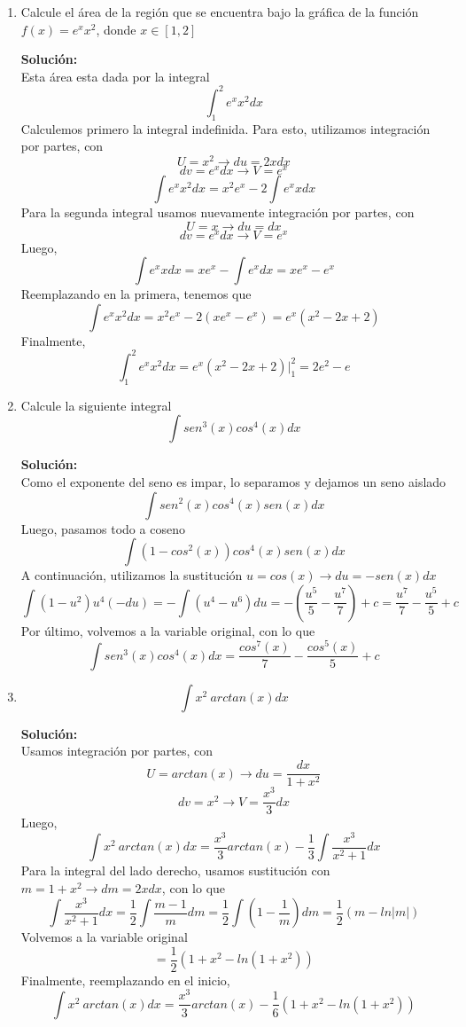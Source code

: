 \documentclass[12pt]{article}
\newenvironment{solucion}
{\begin{mdframed}[backgroundcolor=black!10]
		{\bf Solución:}\\
	}
	{
	\end{mdframed}
}
\newenvironment{preguntas}
{\begin{enumerate}\itemsep12pt
	}
	{
	\end{enumerate}
}
\newcommand{\ev}{\Big|}
\newcommand{\ra}{\rightarrow}
\begin{document}
\begin{preguntas}
\begin{solucion}
		$$\dfrac{x^3+6x^2+13x+10}{x+1} = x^2 +5x + 8 + \dfrac{2}{x+1}$$
		Luego,
		$$\displaystyle\int_0^1 \dfrac{x^3+6x^2+13x+10}{x+1}dx = \displaystyle\int_0^1 \left(x^2 + 5x + 8 +  \dfrac{2}{x+1}\right)dx$$
		$$= \left( \dfrac{x^3}{3} + \dfrac{5x^2}{2} + 8x + 2ln(x+1)\right) \ev_0^1 = \dfrac{1}{3} + \dfrac{5}{2} + 8 + 2ln(2) = \dfrac{65}{6} + 2 ln(2)$$
\end{solucion}
\item Calcule el área de la región que se encuentra bajo la gráfica de la función $f(x) = e^xx^2$, donde $x \in [1,2]$
\begin{solucion}
Esta área esta dada por la integral
		$$\displaystyle \int_1^2 e^x x^2dx$$
		Calculemos primero la integral indefinida. Para esto, utilizamos integración por partes, con
		$$U = x^2 \ra du = 2xdx$$
		$$dv = e^xdx \ra V = e^x$$
		$$\displaystyle \int e^x x^2dx = x^2e^x - 2 \displaystyle \int e^x xdx$$
		Para la segunda integral usamos nuevamente integración por partes, con
		$$U = x \ra du = dx$$
		$$dv = e^xdx \ra V = e^x$$
		Luego,
		$$\displaystyle \int e^x xdx = xe^x - \displaystyle \int e^x dx = xe^x - e^x$$
		Reemplazando en la primera, tenemos que
		$$\displaystyle \int e^x x^2dx = x^2e^x - 2 (xe^x - e^x) = e^x(x^2-2x+2)$$
		Finalmente,
		$$\displaystyle \int_1^2 e^x x^2dx = e^x(x^2-2x+2) \ev_1^2 = 2e^2 - e$$
\end{solucion}
\item Calcule la siguiente integral
	$$\displaystyle\int sen^3(x)cos^4(x)dx$$
\begin{solucion}
Como el exponente del seno es impar, lo separamos y dejamos un seno aislado
		$$\displaystyle\int sen^2(x)cos^4(x) sen(x)dx$$
		Luego, pasamos todo a coseno
		$$\displaystyle\int (1-cos^2(x))cos^4(x) sen(x)dx$$
		A continuación, utilizamos la sustitución $u = cos(x) \ra du = -sen(x)dx$
		$$\displaystyle\int (1-u^2)u^4(- du) = -\displaystyle\int (u^4-u^6)du = -(\dfrac{u^5}{5} - \dfrac{u^7}{7}) +c= \dfrac{u^7}{7}-\dfrac{u^5}{5} + c$$
		Por último, volvemos a la variable original, con lo que
		$$\displaystyle\int sen^3(x)cos^4(x)dx = \dfrac{cos^7(x)}{7}-\dfrac{cos^5(x)}{5} + c$$
\end{solucion}
\item $$\displaystyle\int x^2\ arctan(x)dx$$
\begin{solucion}
Usamos integración por partes, con
		$$U = arctan(x) \ra du = \dfrac{dx}{1+x^2}$$
		$$dv = x^2 \ra V = \dfrac{x^3}{3}dx$$
		Luego,
		$$\displaystyle\int x^2\ arctan(x)dx = \dfrac{x^3}{3}arctan(x) - \dfrac{1}{3} \displaystyle\int \dfrac{x^3}{x^2+1}dx$$
		Para la integral del lado derecho, usamos sustitución con $m = 1+x^2 \ra dm = 2xdx$, con lo que
		$$\displaystyle\int \dfrac{x^3}{x^2+1}dx
		= \dfrac{1}{2}\displaystyle\int \dfrac{m-1}{m}dm
		= \dfrac{1}{2}\displaystyle\int \left(1-\dfrac{1}{m}\right)dm = \dfrac{1}{2}(m-ln|m|)$$
		Volvemos a la variable original
		$$= \dfrac{1}{2}(1+x^2-ln(1+x^2))$$
		Finalmente, reemplazando en el inicio,
		$$\displaystyle\int x^2\ arctan(x)dx = \dfrac{x^3}{3}arctan(x) - \dfrac{1}{6} (1+x^2-ln(1+x^2))$$
\end{solucion}
\end{preguntas}
\end{document}
